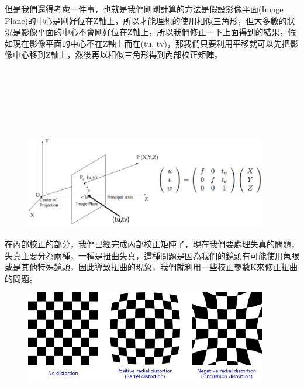 \documentclass{article}
\begin{document}
但是我們還得考慮一件事，也就是我們剛剛計算的方法是假設影像平面(Image Plane)的中心是剛好位在Z軸上，所以才能理想的使用相似三角形，但大多數的狀況是影像平面的中心不會剛好位在Z軸上，所以我們修正一下上面得到的結果，假如現在影像平面的中心不在Z軸上而在(tu, tv)，那我們只要利用平移就可以先把影像中心移到Z軸上，然後再以相似三角形得到內部校正矩陣。
\\\\\\\\\\\\\\
\begin{figure}[htp]
    \begin{center}
        \includegraphics[width=300pt]{pic/圖片8.jpg}
    \end{center}
\end{figure}

在內部校正的部分，我們已經完成內部校正矩陣了，現在我們要處理失真的問題，失真主要分為兩種，一種是扭曲失真，這種問題是因為我們的鏡頭有可能使用魚眼或是其他特殊鏡頭，因此導致扭曲的現象，我們就利用一些校正參數K來修正扭曲的問題。
\\
\begin{figure}[htp]
    \begin{center}
        \includegraphics[width=300pt]{pic/圖片9.jpg}
    \end{center}
\end{figure}
\end{document}
